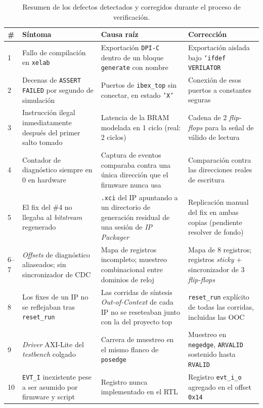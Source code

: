 \begin{table}[htbp]
\centering
\small
\caption{Resumen de los defectos detectados y corregidos durante el proceso de verificación.}
\label{tab:resumen_bugs}
\begin{tabular}{p{0.5cm}p{3.6cm}p{4.3cm}p{4.3cm}}
\hline
\textbf{\#} & \textbf{Síntoma} & \textbf{Causa raíz} & \textbf{Corrección} \\ \hline
1 & Fallo de compilación en \texttt{xelab} & Exportación \texttt{DPI-C} dentro de un bloque \texttt{generate} con nombre & Exportación aislada bajo \texttt{`ifdef VERILATOR} \\
2 & Decenas de \texttt{ASSERT FAILED} por segundo de simulación & Puertos de \texttt{ibex\_top} sin conectar, en estado \texttt{'X'} & Conexión de esos puertos a constantes seguras \\
3 & Instrucción ilegal inmediatamente después del primer salto tomado & Latencia de la BRAM modelada en 1 ciclo (real: 2 ciclos) & Cadena de 2 \textit{flip-flops} para la señal de válido de lectura \\
4 & Contador de diagnóstico siempre en 0 en hardware & Captura de eventos comparaba contra una única dirección que el firmware nunca usa & Comparación contra las direcciones reales de escritura \\
5 & El fix del \#4 no llegaba al \textit{bitstream} regenerado & \texttt{.xci} del IP apuntando a un directorio de generación residual de una sesión de \textit{IP Packager} & Replicación manual del fix en ambas copias (pendiente resolver de fondo) \\
6--7 & \textit{Offsets} de diagnóstico aliaseados; sin sincronizador de CDC & Mapa de registros incompleto; muestreo combinacional entre dominios de reloj & Mapa de 8 registros; registros \textit{sticky} + sincronizador de 3 \textit{flip-flops} \\
8 & Los fixes de un IP no se reflejaban tras \texttt{reset\_run} & Las corridas de síntesis \textit{Out-of-Context} de cada IP no se reseteaban junto con la del proyecto top & \texttt{reset\_run} explícito de todas las corridas, incluidas las OOC \\
9 & \textit{Driver} AXI-Lite del \textit{testbench} colgado & Carrera de muestreo en el mismo flanco de \texttt{posedge} & Muestreo en \texttt{negedge}, \texttt{ARVALID} sostenido hasta \texttt{RVALID} \\
10 & \texttt{EVT\_I} inexistente pese a ser asumido por firmware y script & Registro nunca implementado en el RTL & Registro \texttt{evt\_i\_o} agregado en el offset \texttt{0x14} \\ \hline
\end{tabular}
\end{table}


